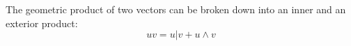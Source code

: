 \begin{theorem}
	The geometric product of two vectors can be broken down into an inner and an exterior product: \[uv = u | v + u \wedge v\]
\end{theorem}
